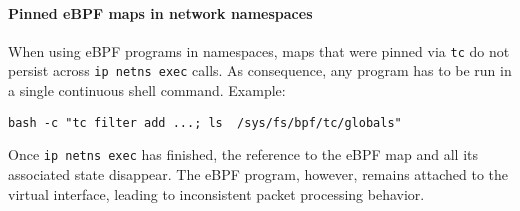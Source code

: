 \paragraph{Pinned eBPF maps in network namespaces}
When using eBPF programs in namespaces, maps that were pinned via \texttt{tc} 
do not persist across \texttt{ip netns exec} calls. As consequence, any 
program has to be run in a single continuous shell command. Example:
{\scriptsize
	\begin{verbatim}
bash -c "tc filter add ...; ls  /sys/fs/bpf/tc/globals"
	\end{verbatim}
}
Once \texttt{ip netns exec} has finished, the reference to the eBPF 
map and all its associated state disappear. The eBPF program, however, remains 
attached to the virtual interface, leading to inconsistent packet processing 
behavior.

